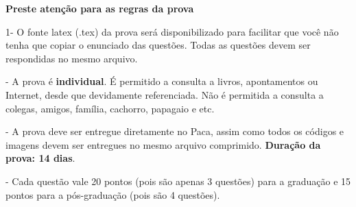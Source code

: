 \documentclass[12pt]{article}
\begin{document}

\begin{center}
{}

\textbf{Preste atenção para as regras da prova}
\end{center}
1- O fonte latex (.tex) da prova será disponibilizado para facilitar
que você não tenha que copiar o enunciado das questões. Todas as questões
devem ser respondidas no mesmo arquivo.

- A prova é \textbf{individual}.  É permitido a consulta a
livros, apontamentos ou Internet, desde que devidamente referenciada.
Não é permitida a consulta a colegas, amigos, família, cachorro,
papagaio e etc. 

- A prova deve ser entregue diretamente no Paca, assim como
todos os códigos e imagens devem ser entregues no mesmo arquivo
comprimido.  \textbf{Duração da prova: 14 dias}.  

- Cada questão vale 20 pontos (pois são apenas 3 questões)
para a graduação e 15 pontos para a pós-graduação (pois são 4 questões). 
\bigskip
\end{document}
